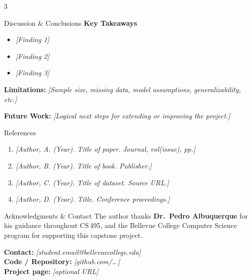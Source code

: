 \documentclass[a0,portrait]{a0poster}
\begin{document}
\begin{multicols}{3}
\begin{posterblock}{Discussion \& Conclusions}
\vspace{0.5em}
\textbf{Key Takeaways}
\begin{itemize}[leftmargin=1.4em,itemsep=4pt,topsep=4pt]
  \item \textit{[Finding 1]}
  \item \textit{[Finding 2]}
  \item \textit{[Finding 3]}
\end{itemize}

\vspace{0.3em}
\textbf{Limitations:} \textit{[Sample size, missing data, model assumptions,
generalizability, etc.]}

\vspace{0.3em}
\textbf{Future Work:} \textit{[Logical next steps for extending or improving
the project.]}
\end{posterblock}

\begin{posterblock}{References}
\normalsize
\begin{enumerate}[leftmargin=1.6em,itemsep=4pt,topsep=4pt]
  \item \textit{[Author, A. (Year). Title of paper. Journal, vol(issue), pp.]}
  \item \textit{[Author, B. (Year). Title of book. Publisher.]}
  \item \textit{[Author, C. (Year). Title of dataset. Source URL.]}
  \item \textit{[Author, D. (Year). Title. Conference proceedings.]}
\end{enumerate}
\end{posterblock}

\begin{posterblock}{Acknowledgments \& Contact}
The author thanks \textbf{Dr.~Pedro Albuquerque} for his guidance throughout
CS\,495, and the Bellevue College Computer Science program for supporting this
capstone project.

\vspace{0.5em}
\textbf{Contact:} \textit{[student.email@bellevuecollege.edu]}\\
\textbf{Code / Repository:} \textit{[github.com/\ldots\,]}\\
\textbf{Project page:} \textit{[optional URL]}
\end{posterblock}

\end{multicols}

\vfill
\noindent{}
\end{document}
